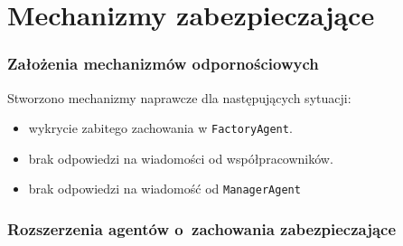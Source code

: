 \documentclass{beamer}
\begin{document}
\section{Mechanizmy zabezpieczające}
\begin{frame}
    \frametitle{Założenia mechanizmów odpornościowych}
    Stworzono mechanizmy naprawcze dla następujących sytuacji:
    \begin{itemize}
        \item wykrycie zabitego zachowania w \texttt{FactoryAgent}.
        \item brak odpowiedzi na wiadomości od współpracowników.
        \item brak odpowiedzi na wiadomość od \texttt{ManagerAgent}
    \end{itemize}
\end{frame}

\begin{frame}
    \frametitle{Rozszerzenia agentów o~zachowania zabezpieczające}
    \begin{figure}[!ht]
    \end{figure}
\end{frame}
\end{document}
